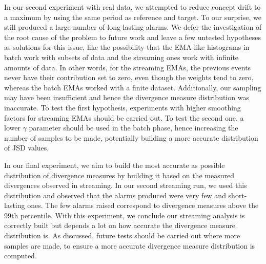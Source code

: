 In our second experiment with real data, we attempted to reduce concept drift to a maximum by using the same period as reference and target. To our surprise, we still produced a large number of long-lasting alarms. We defer the investigation of the root cause of the problem to future work and leave a few untested hypotheses as solutions for this issue, like the possibility that the EMA-like histograms in batch work with subsets of data and the streaming ones work with infinite amounts of data. In other words, for the streaming EMAs, the previous events never have their contribution set to zero, even though the weights tend to zero, whereas the batch EMAs worked with a finite dataset. Additionally, our sampling may have been insufficient and hence the divergence measure distribution was inaccurate. To test the first hypothesis, experiments with higher smoothing factors for streaming EMAs should be carried out. To test the second one, a lower $\gamma$ parameter should be used in the batch phase, hence increasing the number of samples to be made, potentially building a more accurate distribution of JSD values.

In our final experiment, we aim to build the most accurate as possible distribution of divergence measures by building it based on the measured divergences observed in streaming. In our second streaming run, we used this distribution and observed that the alarms produced were very few and short-lasting ones. The few alarms raised correspond to divergence measures above the 99th percentile. With this experiment, we conclude our streaming analysis is correctly built but depends a lot on how accurate the divergence measure distribution is. As discussed, future tests should be carried out where more samples are made, to ensure a more accurate divergence measure distribution is computed.